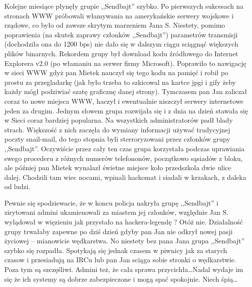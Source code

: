 \documentclass[a4paper,polish,titlepage,12pt]{article}
\begin{document}
Kolejne miesiące płynęły grupie ,,Sendbajt'' szybko. Po pierwszych sukcesach na stronach WWW próbowali włamywania na amerykańskie serwery wojskowe i rządowe, co było od 
zawsze skrytym marzeniem Jana S. Niestety, pomimo poprawienia (na skutek zaprawy członków ,,Sendbajt'') parametrów transmisji (dochodziła ona do 1200 bps) nie dało się w 
dalszym ciągu sciągnąć większych plików binarnych. Rekordem grupy był download kodu źródłowego do Internet Explorera v2.0 (po włamaniu na serwer firmy Microsoft). Poprawiło 
to nawigację w sieci WWW gdyż pan Mietek nauczył się tego kodu na pamięć i robił po prostu za przegladarkę (jak było trzeba to szkicowal na kartce jpgi i gify żeby każdy mógł 
podziwiać szatę graficznę danej strony). Tymczasem pan Jan zaliczał coraz to nowe miejsca WWW, haczył i ewentualnie niszczył serwery internetowe jeden za drugim. Jednym 
słowem grupa rozwijała się i z dnia na dzień stawała się w Sieci coraz bardziej popularna. Na wszystkich administratorów padł blady strach. Większość z nich zaczęła do 
wymiany informacji używać tradycyjnej poczty snail-mail, do tego stopnia byli sterroryzowani przez członków grupy ,,Sendbajt''. Oczywiście przez cały ten czas grupa 
korzystała podczas uprawiania swego procederu z różnych numerów telefononów, początkowo sąsiadów z bloku, ale później pan Mietek wynalazł świetne miejsce koło przedszkola 
dwie ulice dalej. Chodzili tam wiec nocami, wpinali hackomat i siadali w krzakach, z daleka od ludzi.

Pewnie się spodziewacie, że w koncu policja nakryła grupę ,,Sendbajt'' i zirytowani admini ukamienowali za miastem jej czlonków, względnie Jan S. wylądował w więzieniu jak 
przystało na hackera-legendę ? Otóż nie. Działalność grupy trwałaby zapewne po dziś dzień gdyby pan Jan nie odkrył nowej pasji życiowej -- mianowicie wędkarstwa. No niestety 
bez pana Jana grupa ,,Sendbajt'' szybko się rozpadła. Spotykają się jednak czasem w piwnicy jak za starych czasow i przesiadują na IRCu lub pan Jan sciąga sobie stronki o 
wędkarstwie. Poza tym są szczęśliwi. Admini też, że cała sprawa przycichła\dots Nadal wydaje im się że ich systemy są dobrze zabezpieczone i mogą spać spokojnie. Niech śpią\dots 
\end{document}

